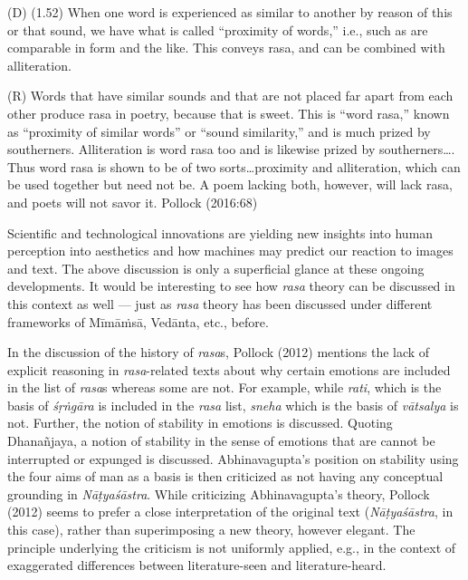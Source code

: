 \begin{myquote}
(D) (1.52) When one word is experienced as similar to another by reason of this or that sound, we have what is called “proximity of words,” i.e., such as are comparable in form and the like. This conveys rasa, and can be combined with alliteration.

(R) Words that have similar sounds and that are not placed far apart from each other produce rasa in poetry, because that is sweet. This is “word rasa,” known as “proximity of similar words” or “sound similarity,” and is much prized by southerners. Alliteration is word rasa too and is likewise prized by southerners…. Thus word rasa is shown to be of two sorts…proximity and alliteration, which can be used together but need not be. A poem lacking both, however, will lack rasa, and poets will not savor it.
\hfill Pollock (2016:68)
\end{myquote}

Scientific and technological innovations are yielding new insights into human perception into aesthetics and how machines may predict our reaction to images and text. The above discussion is only a superficial glance at these ongoing developments. It would be interesting to see how \textsl{rasa} theory can be discussed in this context as well --- just as \textsl{rasa} theory has been discussed under different frameworks of Mīmāṁsā, Vedānta, etc., before. 

In the discussion of the history of \textsl{rasa}s, Pollock (2012) mentions the lack of explicit reasoning in \textsl{rasa}-related texts about why certain emotions are included in the list of \textsl{rasa}s whereas some are not. For example, while \textsl{rati}, which is the basis of \textsl{śṛṅgāra} is included in the \textsl{rasa} list, \textsl{sneha} which is the basis of \textsl{vātsalya} is not. Further, the notion of stability in emotions is discussed. Quoting Dhanañjaya, a notion of stability in the sense of emotions that are cannot be interrupted or expunged is discussed. Abhinavagupta’s position on stability using the four aims of man as a basis is then criticized as not having any conceptual grounding in \textsl{Nāṭyaśāstra}. While criticizing Abhinavagupta’s theory, Pollock (2012) seems to prefer a close interpretation of the original text (\textsl{Nāṭyaśāstra}, in this case), rather than superimposing a new theory, however elegant. The principle underlying the criticism is not uniformly applied, e.g., in the context of exaggerated differences between literature-seen and literature-heard. 

